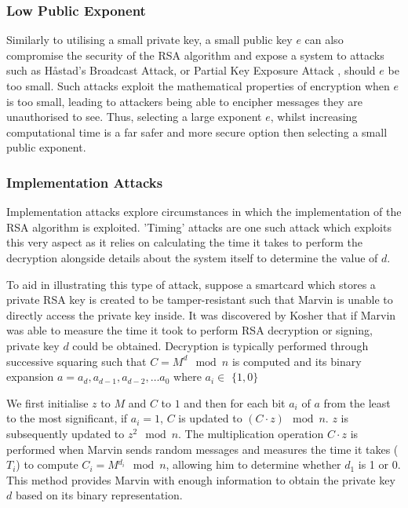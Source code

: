 \documentclass{article}
\begin{document}
\subsubsection{Low Public Exponent}
Similarly to utilising a small private key, a small public key $e$ can also compromise the security of the RSA algorithm and expose a system to attacks such as Håstad's Broadcast Attack, or Partial Key Exposure Attack \cite{attacks}, should $e$ be too small. Such attacks exploit the mathematical properties of encryption when $e$ is too small, leading to attackers being able to encipher messages they are unauthorised to see. Thus, selecting a large exponent $e$, whilst increasing computational time is a far safer and more secure option then selecting a small public exponent.

\subsubsection{Implementation Attacks}
Implementation attacks explore circumstances in which the implementation of the RSA algorithm is exploited. 'Timing' attacks are one such attack which exploits this very aspect as it relies on calculating the time it takes to perform the decryption alongside details about the system itself to determine the value of $d$. 

To aid in illustrating this type of attack, suppose a smartcard which stores a private RSA key is created to be tamper-resistant such that Marvin is unable to directly access the private key inside. It was discovered by Kosher that if Marvin was able to measure the time it took to perform RSA decryption or signing, private key $d$ could be obtained. Decryption is typically performed through successive squaring such that $C = M^d \mod n$ is computed and its binary expansion $a = a_d, a_{d-1}, a_{d-2}, \ldots a_0$ where $a_i \in$ $\{1,0\}$

We first initialise $z$ to $M$ and $C$ to $1$ and then for each bit $a_i$ of $a$ from the least to the most significant, if $a_i = 1$, $C$ is updated to $(C\cdot z) \mod n$. $z$ is subsequently updated to $z^2 \mod n$.  The multiplication operation $C \cdot z$ is performed when Marvin sends random messages and measures the time it takes ($T_i$) to compute $C_i = M{^{d_i}} \mod n$, allowing him to determine whether $d_1$ is 1 or 0. This method provides Marvin with enough information to obtain the private key $d$ based on its binary representation. 
\end{document}
